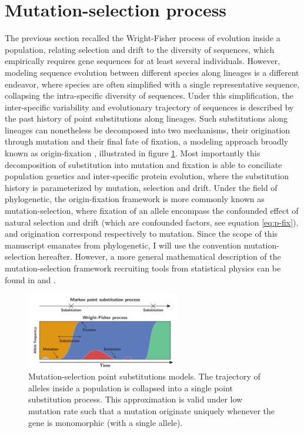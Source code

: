 \section{Mutation-selection process}
The previous section recalled the Wright-Fisher process of evolution inside a population, relating selection and drift to the diversity of sequences, which empirically requires gene sequences for at least several individuals.
However, modeling sequence evolution between different species along lineages is a different endeavor, where species are often simplified with a single representative sequence, collapsing the intra-specific diversity of sequences.
Under this simplification, the inter-specific variability and evolutionary trajectory of sequences is described by the past history of point \glspl{substitution} along lineages.
Such \glspl{substitution} along lineages can nonetheless be decomposed into two mechanisms, their origination through mutation and their final fate of fixation, a modeling approach broadly known as origin-fixation \citep{McCandlish2014}, illustrated in figure \ref{fig:point-process}.
Most importantly this decomposition of \gls{substitution} into mutation and fixation is able to conciliate population genetics and inter-specific protein evolution, where the \gls{substitution} history is parameterized by mutation, selection and drift.
Under the field of phylogenetic, the origin-fixation framework is more commonly known as mutation-selection, where fixation of an \gls{allele} encompass the confounded effect of natural selection and drift (which are confounded factors, see equation \ref{eq:p-fix}), and origination correspond respectively to mutation.
Since the scope of this manuscript emanates from phylogenetic, I will use the convention mutation-selection hereafter.
However, a more general mathematical description of the mutation-selection framework recruiting tools from statistical physics can be found in \citet{Sella2005} and \citet{Mustonen2009}.

\begin{figure}[H]
	\centering
	\includegraphics[width=0.6\textwidth]{figures/point-process.pdf}
	\caption[Mutation-selection point substitutions]{
	Mutation-selection point \glspl{substitution} models.
	The trajectory of \glspl{allele} inside a population is collapsed into a single point \gls{substitution} process.
	This approximation is valid under low mutation rate such that a mutation originate uniquely whenever the gene is monomorphic (with a single allele).}
	\label{fig:point-process}
\end{figure}

